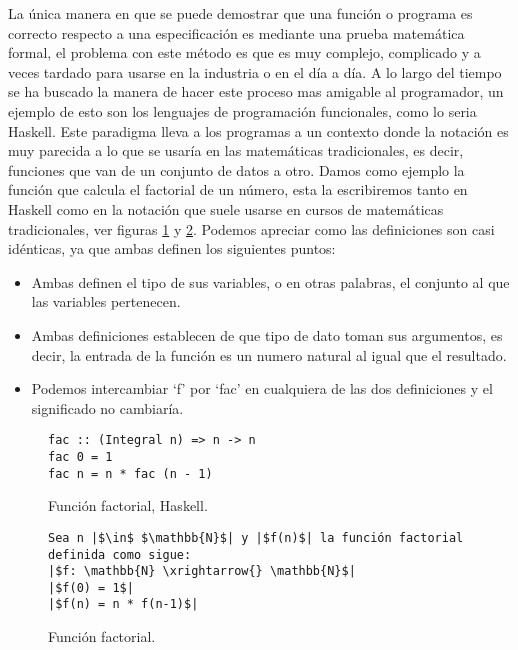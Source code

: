 La única manera en que se puede demostrar que una función o programa 
es correcto respecto a una especificación es mediante una prueba 
matemática formal, el problema con este método es que es muy complejo, 
complicado y a veces tardado para usarse en la industria o en el día a día. A lo largo del tiempo se ha buscado la manera de hacer este proceso mas amigable al
programador, un ejemplo de esto son los lenguajes de programación funcionales, como lo seria Haskell. Este paradigma lleva
a los programas a un contexto donde la notaci\'on es muy parecida a lo que se usar\'ia en las
matemáticas tradicionales, es decir, funciones que van de un conjunto de datos a otro. Damos como ejemplo la funci\'on que calcula el factorial de un n\'umero, esta la escribiremos tanto en Haskell como en la notaci\'on que suele usarse en cursos de matemáticas tradicionales, ver figuras \ref{func_fact_hask} y \ref{func_fact_math}. 
Podemos apreciar como las definiciones son casi idénticas, ya que ambas definen los siguientes puntos:
\begin{itemize}
    \item Ambas definen el tipo de sus variables, o en otras palabras, el conjunto al que las variables pertenecen.
    \item Ambas definiciones establecen de que tipo de dato toman sus argumentos, es decir, la entrada de la funci\'on es un numero natural al igual que el resultado.
    \item Podemos intercambiar `f' por `fac' en cualquiera de las dos definiciones y el significado no cambiaría.
\end{itemize}
\begin{figure}[!ht]
\centering
\captionsetup{justification=centering}
\begin{verbatim}
fac :: (Integral n) => n -> n
fac 0 = 1
fac n = n * fac (n - 1)
\end{verbatim}
\caption{Funci\'on factorial, Haskell.}
\label{func_fact_hask}
\end{figure}

\begin{figure}[!ht]
\centering
\captionsetup{justification=centering}
\begin{verbatim}
Sea n |$\in$ $\mathbb{N}$| y |$f(n)$| la función factorial definida como sigue:
|$f: \mathbb{N} \xrightarrow{} \mathbb{N}$|
|$f(0) = 1$|
|$f(n) = n * f(n-1)$|
\end{verbatim}
\caption{Funci\'on factorial.}
\label{func_fact_math}
\end{figure}

